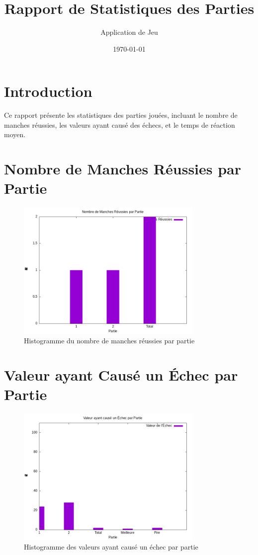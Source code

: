 \documentclass{article}
\title{Rapport de Statistiques des Parties}
\author{Application de Jeu}
\date{\today}
\begin{document}
\maketitle

\section*{Introduction}
Ce rapport présente les statistiques des parties jouées, incluant le nombre de manches réussies, les valeurs ayant causé des échecs, et le temps de réaction moyen.

\section*{Nombre de Manches Réussies par Partie}
\begin{figure}[h!]
    \centering
    \includegraphics[width=0.8\textwidth]{manches_reussies.png}
    \caption{Histogramme du nombre de manches réussies par partie}
\end{figure}

\section*{Valeur ayant Causé un Échec par Partie}
\begin{figure}[h!]
    \centering
    \includegraphics[width=0.8\textwidth]{valeur_echec.png}
    \caption{Histogramme des valeurs ayant causé un échec par partie}
\end{figure}
\end{document}
